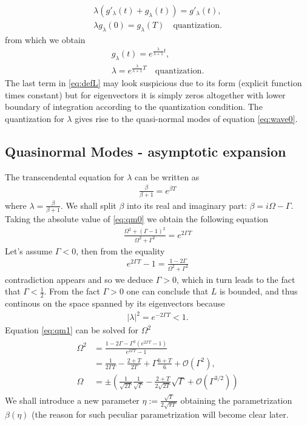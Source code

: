 \documentclass[
a4paper,%
10pt,%
titlepage,%
twoside%
]{article}
\begin{document}
\begin{gather}
  \lambda(g'_\lambda(t)+g_\lambda(t))=g'_\lambda(t),\\
  \lambda g_\lambda(0)=g_\lambda(T)\quad\text{quantization}.
\end{gather}
from which we obtain
\begin{gather}
  g_\lambda(t)=e^{\frac{\lambda}{\lambda+1}t},\\
  \lambda=e^{\frac{\lambda}{\lambda+1}T}\quad\text{quantization}.
\end{gather}
The last term in \eqref{eq:defL} may look suspicious due to its form
(explicit function times constant) but for eigenvectors it is simply
zeros altogether with lower boundary of integration according to the
quantization condition. The quantization for $\lambda$ gives rise to
the quasi-normal modes of equation \eqref{eq:wave0}.

\subsection{Quasinormal Modes - asymptotic expansion}
The transcendental equation for $\lambda$ can be written as
\begin{gather}\label{eq:qm0}
  \frac{\beta}{\beta+1}=e^{\beta T}
\end{gather}
where $\lambda=\frac{\beta}{\beta+1}$. We shall split $\beta$ into its
real and imaginary part: $\beta=i\Omega-\Gamma$.  Taking the absolute
value of \eqref{eq:qm0} we obtain the following equation
\begin{gather}\label{eq:qm1}
  \frac{\Omega^2+(\Gamma-1)^2}{\Omega^2+\Gamma^2}=e^{2\Gamma T}
\end{gather}
Let's assume $\Gamma<0$, then from the equality
\begin{gather}\label{eq:g_ineq}
  e^{2\Gamma T}-1=\frac{1-2\Gamma}{\Omega^2+\Gamma^2}
\end{gather}
contradiction appears and so we deduce $\Gamma>0$, which in turn leads
to the fact that $\Gamma<\frac{1}{2}$. From the fact $\Gamma>0$ one
can conclude that $L$ is bounded, and thus continous on the space spanned
by its eigenvectors because
\begin{gather}
|\lambda|^2=e^{-2\Gamma T}<1.
\end{gather}
Equation
\eqref{eq:qm1} can be solved for $\Omega^2$
\begin{gather}
  \begin{split}
    \Omega^2&=\frac{1-2\Gamma-\Gamma^2(e^{2\Gamma T}-1)}{e^{2\Gamma T}-1}\\
    &=\frac{1}{2\Gamma T}-\frac{2+T}{2T}+\Gamma\frac{6+T}{6}+\mathcal{O}(\Gamma^2),\\
    \Omega&=\pm(\frac{1}{\sqrt{2T}}\frac{1}{\sqrt{\Gamma}}-\frac{2+T}{2\sqrt{2T}}\sqrt{\Gamma}+\mathcal{O}(\Gamma^{3/2}))
  \end{split}
\end{gather}
We shall introduce a new parameter
$\eta:=\frac{\sqrt{T}}{2\sqrt{\pi\Gamma}}$ obtaining the
parametrization $\beta(\eta)$ (the reason for such peculiar
parametrization will become clear later.
\end{document}
